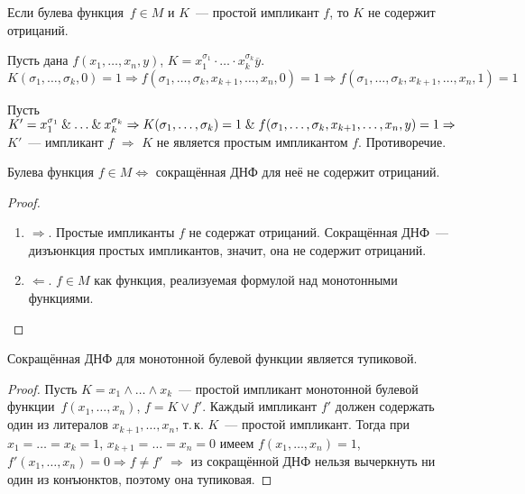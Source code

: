 \begin{theorem}
Если булева функция~$f \in M$ и $K$~--- простой импликант $f$, то $K$ не содержит отрицаний.
\end{theorem}
\begin{proofcontra}
Пусть дана $f(x_1, \ldots, x_n, y)$, $K = x_1^{\sigma_1} \cdot \ldots \cdot x_k^{\sigma_k} \overline y$.
\begin{equation*}
K(\sigma_1, \ldots, \sigma_k, 0) = 1 \Rightarrow
f(\sigma_1, \ldots, \sigma_k, x_{k+1}, \ldots, x_n, 0) = 1 \Rightarrow
f(\sigma_1, \ldots, \sigma_k, x_{k+1}, \ldots, x_n, 1) = 1
\end{equation*}

Пусть $K' = x_1^{\sigma_1} \mathbin{\&} \ldots \mathbin{\&} x_k^{\sigma_k} \Rightarrow
K(\sigma_1, \ldots, \sigma_k) = 1 \mathrel{\&} f(\sigma_1, \ldots, \sigma_k, x_{k+1}, \ldots, x_n, y) = 1 \Rightarrow$ $K'$~--- импликант $f$ $\Rightarrow$ $K$ не является простым импликантом $f$.
Противоречие.
\end{proofcontra}

\begin{theorem}
Булева функция $f \in M \Leftrightarrow$ сокращённая ДНФ для неё не содержит отрицаний.
\end{theorem}
\begin{proof}
\begin{enumerate}
	\item $\Rightarrow$. Простые импликанты $f$ не содержат отрицаний.
	Сокращённая ДНФ~--- дизъюнкция простых импликантов, значит, она не содержит отрицаний.
	\item $\Leftarrow$. $f \in M$ как функция, реализуемая формулой над монотонными функциями.
\end{enumerate}
\end{proof}

\begin{theorem}
Сокращённая ДНФ для монотонной булевой функции является тупиковой.
\end{theorem}
\begin{proof}
Пусть $K = x_1 \land \ldots \land x_k$~--- простой импликант монотонной булевой функции~$f(x_1, \ldots, x_n)$, $f = K \lor f'$.
Каждый импликант $f'$ должен содержать один из литералов $x_{k+1}, \ldots, x_n$, т.\,к. $K$~--- простой импликант.
Тогда при $x_1 = \ldots = x_k = 1$, $x_{k+1} = \ldots = x_n = 0$ имеем $f(x_1, \ldots, x_n) = 1$, $f'(x_1, \ldots, x_n) = 0 \Rightarrow f \neq f'$ $\Rightarrow$ из сокращённой ДНФ нельзя вычеркнуть ни один из конъюнктов, поэтому она тупиковая.
\end{proof}

